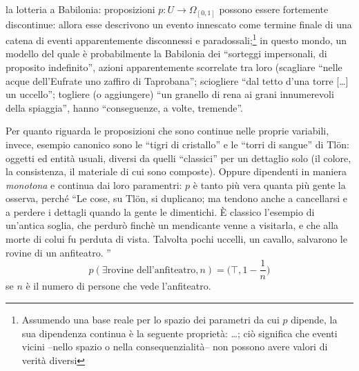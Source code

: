 \begin{example}
  la lotteria a Babilonia: proposizioni $p : U \to \Omega_{[0,1]}$ possono essere fortemente discontinue: allora esse descrivono un evento innescato come termine finale di una catena di eventi apparentemente disconnessi e paradossali;\footnote{Assumendo una base reale per lo spazio dei parametri da cui $p$ dipende, la sua dipendenza continua è la seguente proprietà: \dots; ciò significa che eventi vicini --nello spazio o nella consequenzialità-- non possono avere valori di verità diversi} in questo mondo, un modello del quale è probabilmente la Babilonia dei ``sorteggi impersonali, di proposito indefinito'', azioni apparentemente scorrelate tra loro (scagliare ``nelle acque dell'Eufrate uno zaffiro di Taprobana''; sciogliere ``dal tetto d'una torre [\dots\unkern] un uccello''; togliere (o aggiungere) ``un granello di rena ai grani innumerevoli della spiaggia'', hanno ``conseguenze, a volte, tremende''.
\end{example}
\begin{example}
  Per quanto riguarda le proposizioni che sono continue nelle proprie variabili, invece, esempio canonico sono le ``tigri di cristallo'' e le ``torri di sangue'' di Tl\"{o}n: oggetti ed entità usuali, diversi da quelli ``classici'' per un dettaglio solo (il colore, la consistenza, il materiale di cui sono composte). Oppure dipendenti in maniera \emph{monotona} e continua dai loro paramentri: $p$ è tanto più vera quanta più gente la osserva, perché ``Le cose, su Tlön, si duplicano; ma tendono anche a cancellarsi e a  perdere i dettagli quando la gente le dimentichi. È classico l'esempio di  un'antica soglia, che perdurò finchè un mendicante venne a visitarla, e che alla  morte di colui fu perduta di vista. Talvolta pochi uccelli, un cavallo, salvarono le  rovine di un anfiteatro. ''
        \[\textstyle p(\exists\text{rovine dell'anfiteatro}, n) = \big(\top, 1-\frac{1}{n}\big)\]
        se $n$ è il numero di persone che vede l'anfiteatro.
\end{example}
